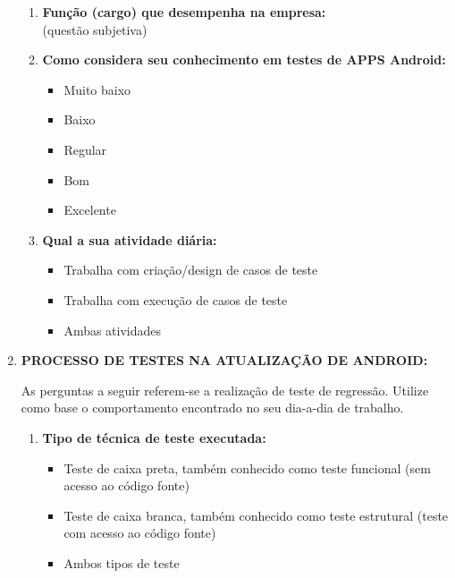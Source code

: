 \begin{enumerate}[label=\bf A\arabic*,leftmargin=1.8cm]
\begin{enumerate}[label= \arabic*]
        \item \textbf{Função (cargo) que desempenha na empresa:}\\
        (questão subjetiva)
        
        \item \textbf{Como considera seu conhecimento em testes de \ac{APPS} Android:}
        \begin{itemize}
            \item Muito baixo
            \item Baixo
            \item Regular
            \item Bom
            \item Excelente
        \end{itemize}
        
        \item \textbf{Qual a sua atividade diária:}
        \begin{itemize}
            \item Trabalha com criação/design de casos de teste
            \item Trabalha com execução de casos de teste
            \item Ambas atividades
        \end{itemize}        
        
     \end{enumerate}
     
     
    
     \item \textbf{PROCESSO DE TESTES NA ATUALIZAÇÃO DE  ANDROID:}
     
     
     As perguntas a seguir referem-se a realização de teste de regressão. Utilize como base o comportamento encontrado no seu dia-a-dia de trabalho.
     
     \begin{enumerate}[label= \arabic*]
     
     \item \textbf{Tipo de técnica de teste executada:}
     \begin{itemize}
         \item Teste de caixa preta, também conhecido como teste funcional (sem acesso ao código fonte)
         \item Teste de caixa branca, também conhecido como teste estrutural (teste com acesso ao código fonte)
         \item Ambos tipos de teste
     \end{itemize}
     

\end{enumerate}
\end{enumerate}

